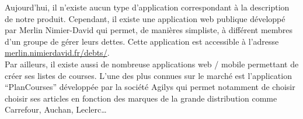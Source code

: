 Aujourd'hui, il n'existe aucun type d'application correspondant à la description de notre produit. Cependant, il existe une application web publique développé par Merlin Nimier-David qui permet, de manières simpliste, à différent membres d'un groupe de gérer leurs dettes. Cette application est accessible à l'adresse \url{merlin.nimierdavid.fr/debts/}.\\

Par ailleurs, il existe aussi de nombreuse applications web / mobile permettant de créer ses listes de courses. L'une des plus connues sur le marché est l'application ``PlanCourses'' développée par la société Agilys qui permet notamment de choisir choisir ses articles en fonction des marques de la grande distribution comme Carrefour, Auchan, Leclerc\ldots
